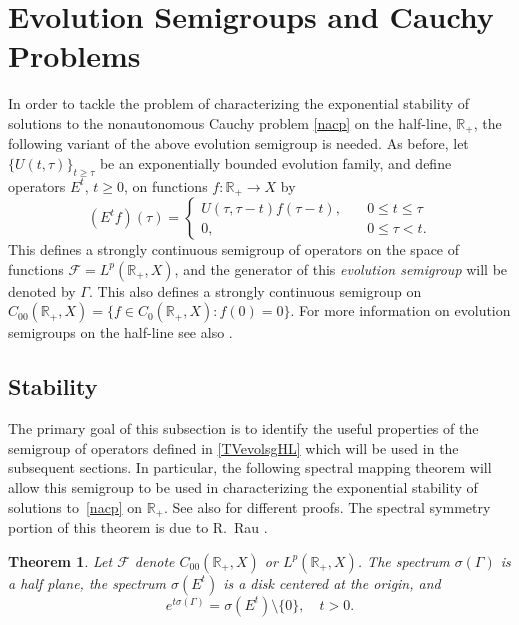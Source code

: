 \documentclass[10pt,psamsfonts,leqno]{siamltex}
\newtheorem{thm}[prop]{Theorem}
\newcommand{\bbR}{\mathbb{R}}
\newcommand{\lb}{\label}
\newcommand{\LpRp}{{L^p(\bbR_+,X)}}
\begin{document}
\section{Evolution Semigroups and Cauchy Problems}

In order to tackle the problem of characterizing the exponential
stability of solutions to the nonautonomous Cauchy problem
\eqref{nacp} on the half-line, $\bbR_+$,
the following variant of the above evolution semigroup is needed.
As before, let
$\{U(t,\tau)\}_{t\ge\tau}$ be an exponentially bounded
evolution family, and define operators $E^t$, $t\ge0$, on
functions $f:\bbR_+\to X$  by
\begin{equation}\lb{TVevolsgHL}
(E^tf)(\tau)= \begin{cases}
  U(\tau,\tau-t)f(\tau-t),\quad &0 \le t \le \tau \\
0,\qquad &0 \le \tau < t.
  \end{cases}
\end{equation}
This defines a strongly continuous semigroup of operators on
the space of functions $\mathcal{F}=\LpRp$, and the generator
of this {\em evolution semigroup} will be  denoted by
$\Gamma$.   This also defines a strongly continuous semigroup on
$C_{00}(\bbR_+,X)=\{f\in C_0(\bbR_+,X):f(0)=0\}$.
For more information on evolution semigroups on the half-line
 see also \cite{MiRaSc,vanN1,vanNbook,RolandDis}.

\subsection{Stability}
The primary goal of this subsection is
to identify the useful properties of the semigroup of operators
defined in \eqref{TVevolsgHL}
which will be used in the subsequent sections.  In particular,
the following spectral mapping theorem will allow this semigroup
to be used in characterizing the exponential stability of
solutions to~\eqref{nacp} on $\bbR_+$.
See also \cite{RS1,RolandDis} for different proofs.
The spectral symmetry portion of this theorem is due to
R.~Rau \cite{Rau}.

\begin{thm}\lb{SMT+}
Let $\mathcal{F}$ denote $C_{00}(\bbR_+,X)$ or $\LpRp$.
The spectrum $\sigma(\Gamma)$ is a half plane, the spectrum
$\sigma(E^t)$ is a disk centered at the origin, and
\begin{equation}\lb{SMT+eq}
e^{t\sigma(\Gamma)}=\sigma(E^t)\setminus\{0\},\quad t>0.
\end{equation}
\end{thm}
\end{document}
